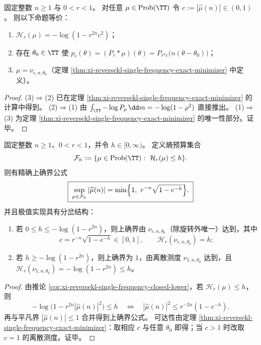 \begin{theorem}\label{thm:xi-reversekl-single-frequency-rigidity-equivalences}
固定整数 \(n\ge 1\) 与 \(0<r<1\)。
对任意 \(\mu\in\mathrm{Prob}(\TT)\) 令 \(c:=|\widehat\mu(n)|\in(0,1)\)。
则以下命题等价：
\begin{enumerate}
  \item \(\mathcal H_r(\mu)=-\log(1-r^{2n}c^2)\)；
  \item 存在 \(\theta_0\in\TT\) 使 \(p_r(\theta)=(P_r*\mu)(\theta)=P_{r^n c}\!\bigl(n(\theta-\theta_0)\bigr)\)；
  \item \(\mu=\nu_{c,n,\theta_0}\)（定理 \ref{thm:xi-reversekl-single-frequency-exact-minimizer} 中定义）。
\end{enumerate}
\end{theorem}

\begin{proof}
(3)\(\Rightarrow\)(2) 已在定理 \ref{thm:xi-reversekl-single-frequency-exact-minimizer} 的计算中得到。
(2)\(\Rightarrow\)(1) 由 \(\int_{\TT}-\log P_\rho\,\dd m=-\log(1-\rho^2)\) 直接推出。
(1)\(\Rightarrow\)(3) 为定理 \ref{thm:xi-reversekl-single-frequency-exact-minimizer} 的唯一性部分。证毕。
\end{proof}

\begin{theorem}[熵预算下的可达单频幅度上确界与两相实现]\label{thm:xi-reversekl-single-frequency-entropy-budget-sup}
固定整数 \(n\ge 1\)、\(0<r<1\)，并令 \(h\in[0,\infty)\)。
定义熵预算集合
\[
\mathcal F_h:=\{\mu\in\mathrm{Prob}(\TT):\ \mathcal H_r(\mu)\le h\}.
\]
则有精确上确界公式
\[
\boxed{\;
\sup_{\mu\in\mathcal F_h}|\widehat\mu(n)|
=\min\Bigl\{1,\ r^{-n}\sqrt{1-e^{-h}}\Bigr\}. \;}
\]
并且极值实现具有分岔结构：
\begin{enumerate}
  \item 若 \(0\le h\le -\log(1-r^{2n})\)，则上确界由 \(\nu_{c,n,\theta_0}\)（除旋转外唯一）达到，其中
  \[
  c=r^{-n}\sqrt{1-e^{-h}}\in[0,1],
  \qquad
  \mathcal H_r(\nu_{c,n,\theta_0})=h;
  \]
  \item 若 \(h\ge -\log(1-r^{2n})\)，则上确界为 \(1\)，由离散测度 \(\nu_{1,n,\theta_0}\) 达到，且
  \(
  \mathcal H_r(\nu_{1,n,\theta_0})=-\log(1-r^{2n})\le h
  \)。
\end{enumerate}
\end{theorem}

\begin{proof}
由推论 \ref{cor:xi-reversekl-single-frequency-closed-lower}，若 \(\mathcal H_r(\mu)\le h\)，则
\[
-\log\bigl(1-r^{2n}|\widehat\mu(n)|^2\bigr)\le h
\quad\Longleftrightarrow\quad
|\widehat\mu(n)|^2\le r^{-2n}(1-e^{-h}).
\]
再与平凡界 \(|\widehat\mu(n)|\le 1\) 合并得到上确界公式。
可达性由定理 \ref{thm:xi-reversekl-single-frequency-exact-minimizer}：取相应 \(c\) 与任意 \(\theta_0\) 即得；当 \(c>1\) 时改取 \(c=1\) 的离散测度。证毕。
\end{proof}

